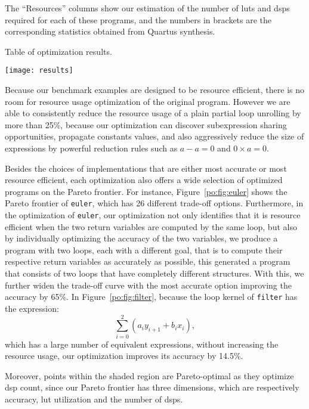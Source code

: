 The ``Resources'' columns show our estimation of the number of \glspl{lut}
and \glspl{dsp} required for each of these programs, and the numbers in
brackets are the corresponding statistics obtained from Quartus synthesis.

\begin{table}[ht]
    \centering
    \caption{
        Table of optimization results.
    }\label{po:fig:results}
    \texttt{[image: results]}
\end{table}

Because our benchmark examples are designed to be resource efficient, there
is no room for resource usage optimization of the original program.  However
we are able to consistently reduce the resource usage of a plain partial
loop unrolling by more than 25\%, because our optimization can discover
subexpression sharing opportunities, propagate constants values, and also
aggressively reduce the size of expressions by powerful reduction rules such as
$a - a = 0$ and $0 \times a = 0$.

Besides the choices of implementations that are either most accurate or most
resource efficient, each optimization also offers a wide selection of optimized
programs on the Pareto frontier.  For instance, Figure~\ref{po:fig:euler}
shows the Pareto frontier of \texttt{euler}, which has 26 different trade-off
options.  Furthermore, in the optimization of \texttt{euler}, our optimization
not only identifies that it is resource efficient when the two return variables
are computed by the same loop, but also by individually optimizing the
accuracy of the two variables, we produce a program with two loops, each with
a different goal, that is to compute their respective return variables as
accurately as possible, this generated a program that consists of two loops
that have completely different structures.  With this, we further widen the
trade-off curve with the most accurate option improving the accuracy by 65\%.
In Figure~\ref{po:fig:filter}, because the loop kernel of \texttt{filter}
has the expression:
\begin{equation}
    \sum_{i=0}^2{\left( a_i y_{i+1} + b_i x_i \right)},
\end{equation}
which has a large number of equivalent expressions, without increasing the
resource usage, our optimization improves its accuracy by 14.5\%.

Moreover, points within the shaded region are Pareto-optimal as they optimize
\gls{dsp} count, since our Pareto frontier has three dimensions, which are
respectively accuracy, \gls{lut} utilization and the number of \glspl{dsp}.

